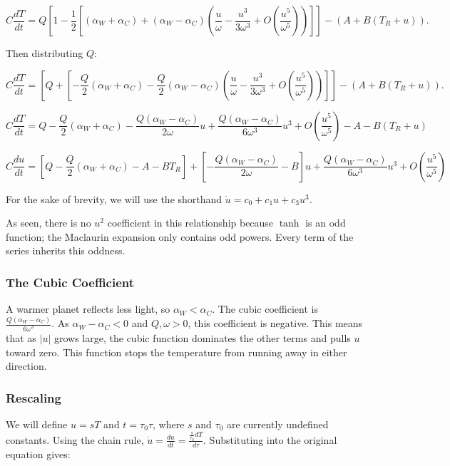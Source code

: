     \[
        C\frac{dT}{dt} = Q\left[1-\frac{1}{2}\left[\left(\alpha_W+\alpha_C\right)+\left(\alpha_W-\alpha_C\right)\left(\frac{u}{\omega}-\frac{u^3}{3\omega^3}+O\left(\frac{u^5}{\omega^5}\right)\right)\right] \right]-(A+B\left(T_R+u\right)).
    \]

    Then distributing $Q$:

    \[
        C\frac{dT}{dt} = \left[Q+\left[-\frac{Q}{2}\left(\alpha_W+\alpha_C\right)-\frac{Q}{2}\left(\alpha_W-\alpha_C\right)\left(\frac{u}{\omega}-\frac{u^3}{3\omega^3}+O\left(\frac{u^5}{\omega^5}\right)\right)\right] \right]-(A+B\left(T_R+u\right)).
    \]

    \[
        C\frac{dT}{dt} = Q-\frac{Q}{2}\left(\alpha_W+\alpha_C\right) -\frac{Q\left(\alpha_W-\alpha_C\right)}{2\omega}u+\frac{Q\left(\alpha_W-\alpha_C\right)}{6\omega^3}u^3+O\left(\frac{u^5}{\omega^5}\right)-A-B\left(T_R+u\right)
    \]

    \[
        C\frac{du}{dt} = \left[Q-\frac{Q}{2}\left(\alpha_W+\alpha_C\right)-A-BT_R\right] + \left[-\frac{Q\left(\alpha_W-\alpha_C\right)}{2\omega}-B\right]u+\frac{Q\left(\alpha_W-\alpha_C\right)}{6\omega^3}u^3+O\left(\frac{u^5}{\omega^5}\right)
    \]

    For the sake of brevity, we will use the shorthand $\dot u = c_0+c_1u+c_3u^3$.

    As seen, there is no $u^2$ coefficient in this relationship because $\tanh$ is an odd function; the Maclaurin expansion only contains odd powers. Every term of the series inherits this oddness.


    \subsubsection{The Cubic Coefficient}\label{subsubsec:the-cubic-coefficient}

    A warmer planet reflects less light, so $\alpha_W<\alpha_C$. The cubic coefficient is $\frac{Q\left(\alpha_W-\alpha_C\right)}{6\omega^3}$. As $\alpha_W-\alpha_C<0$ and $Q,\omega>0$, this coefficient is negative. This means that as $|u|$ grows large, the cubic function dominates the other terms and pulls $u$ toward zero. This function stops the temperature from running away in either direction.


    \subsubsection{Rescaling}\label{subsubsec:rescaling}

    We will define $u=sT$ and $t=\tau_0\tau$, where $s$ and $\tau_0$ are currently undefined constants. Using the chain rule, $\dot u = \frac{du}{dt}=\frac{\frac{s}{\tau_0}dT}{d\tau}$. Substituting into the original equation gives:

